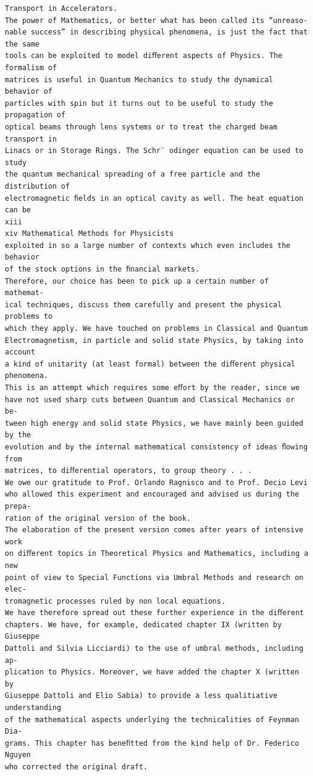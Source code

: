 \begin{verbatim}
Transport in Accelerators.
The power of Mathematics, or better what has been called its “unreaso-
nable success” in describing physical phenomena, is just the fact that the same
tools can be exploited to model diﬀerent aspects of Physics. The formalism of
matrices is useful in Quantum Mechanics to study the dynamical behavior of
particles with spin but it turns out to be useful to study the propagation of
optical beams through lens systems or to treat the charged beam transport in
Linacs or in Storage Rings. The Schr¨ odinger equation can be used to study
the quantum mechanical spreading of a free particle and the distribution of
electromagnetic ﬁelds in an optical cavity as well. The heat equation can be
xiii
xiv Mathematical Methods for Physicists
exploited in so a large number of contexts which even includes the behavior
of the stock options in the ﬁnancial markets.
Therefore, our choice has been to pick up a certain number of mathemat-
ical techniques, discuss them carefully and present the physical problems to
which they apply. We have touched on problems in Classical and Quantum
Electromagnetism, in particle and solid state Physics, by taking into account
a kind of unitarity (at least formal) between the diﬀerent physical phenomena.
This is an attempt which requires some eﬀort by the reader, since we
have not used sharp cuts between Quantum and Classical Mechanics or be-
tween high energy and solid state Physics, we have mainly been guided by the
evolution and by the internal mathematical consistency of ideas ﬂowing from
matrices, to diﬀerential operators, to group theory . . .
We owe our gratitude to Prof. Orlando Ragnisco and to Prof. Decio Levi
who allowed this experiment and encouraged and advised us during the prepa-
ration of the original version of the book.
The elaboration of the present version comes after years of intensive work
on diﬀerent topics in Theoretical Physics and Mathematics, including a new
point of view to Special Functions via Umbral Methods and research on elec-
tromagnetic processes ruled by non local equations.
We have therefore spread out these further experience in the diﬀerent
chapters. We have, for example, dedicated chapter IX (written by Giuseppe
Dattoli and Silvia Licciardi) to the use of umbral methods, including ap-
plication to Physics. Moreover, we have added the chapter X (written by
Giuseppe Dattoli and Elio Sabia) to provide a less qualitiative understanding
of the mathematical aspects underlying the technicalities of Feynman Dia-
grams. This chapter has beneﬁtted from the kind help of Dr. Federico Nguyen
who corrected the original draft.

\end{verbatim}

